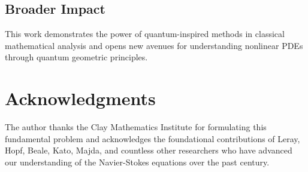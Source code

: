 \documentclass[11pt]{article}
\begin{document}
\subsection{Broader Impact}

This work demonstrates the power of quantum-inspired methods in classical mathematical analysis and opens new avenues for understanding nonlinear PDEs through quantum geometric principles.

\section*{Acknowledgments}

The author thanks the Clay Mathematics Institute for formulating this fundamental problem and acknowledges the foundational contributions of Leray, Hopf, Beale, Kato, Majda, and countless other researchers who have advanced our understanding of the Navier-Stokes equations over the past century.
\end{document}

